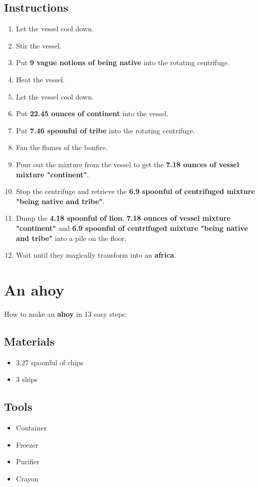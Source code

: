 \documentclass{article}
\begin{document}
\subsection{Instructions}\begin{enumerate}
\item 
Let the vessel cool down.
\item 
Stir the vessel.
\item 
Put \textbf{9 vague notions of being native} into the rotating centrifuge.
\item 
Heat the vessel.
\item 
Let the vessel cool down.
\item 
Put \textbf{22.45 ounces of continent} into the vessel.
\item 
Put \textbf{7.46 spoonful of tribe} into the rotating centrifuge.
\item 
Fan the flames of the bonfire.
\item 
Pour out the mixture from the vessel to get the \textbf{7.18 ounces of vessel mixture "continent"}.
\item 
Stop the centrifuge and retrieve the \textbf{6.9 spoonful of centrifuged mixture "being native and tribe"}.
\item 
Dump the \textbf{4.18 spoonful of lion}, \textbf{7.18 ounces of vessel mixture "continent"} and \textbf{6.9 spoonful of centrifuged mixture "being native and tribe"} into a pile on the floor.
\item 
Wait until they magically transform into an \textbf{africa}.
\end{enumerate}
\newpage
\section{An ahoy}How to make an \textbf{ahoy} in 13 easy steps:

\subsection{Materials}\begin{itemize}
\item 
3.27 spoonful of chips
\item 
3 ships
\end{itemize}
\subsection{Tools}\begin{itemize}
\item 
Container
\item 
Freezer
\item 
Purifier
\item 
Crayon
\end{itemize}
\end{document}
